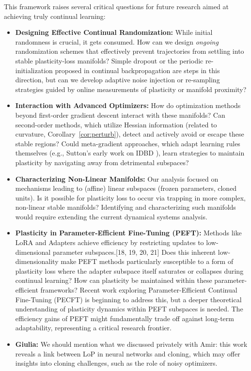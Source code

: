 \documentclass{article}
\newcommand{\giulia}[1]{{\color{ForestGreen}\textbf{Giulia:} #1}}
\begin{document}
This framework raises several critical questions for future research aimed at achieving truly continual learning:

\begin{itemize}[nosep]
    \item \textbf{Designing Effective Continual Randomization:} While initial randomness is crucial, it gets consumed. How can we design \emph{ongoing} randomization schemes that effectively prevent trajectories from settling into stable plasticity-loss manifolds? Simple dropout \citep{srivastava2014dropout} or the periodic re-initialization proposed in continual backpropagation \citep{dohare2024loss} are steps in this direction, but can we develop adaptive noise injection or re-sampling strategies guided by online measurements of plasticity or manifold proximity?
    \item \textbf{Interaction with Advanced Optimizers:} How do optimization methods beyond first-order gradient descent interact with these manifolds? Can second-order methods, which utilize Hessian information (related to curvature, Corollary~\ref{cor:perturb}), detect and actively avoid or escape these stable regions? Could meta-gradient approaches, which adapt learning rules themselves (e.g., Sutton's early work on IDBD \citep{sutton1992gain}), learn strategies to maintain plasticity by navigating away from detrimental subspaces? 
    \item \textbf{Characterizing Non-Linear Manifolds:} Our analysis focused on mechanisms leading to (affine) linear subspaces (frozen parameters, cloned units). Is it possible for plasticity loss to occur via trapping in more complex, non-linear stable manifolds? Identifying and characterizing such manifolds would require extending the current dynamical systems analysis.
    \item \textbf{Plasticity in Parameter-Efficient Fine-Tuning (PEFT):} Methods like LoRA \citep{hu2021lora} and Adapters \citep{houlsby2019parameter} achieve efficiency by restricting updates to low-dimensional parameter subspaces.[18, 19, 20, 21] Does this inherent low-dimensionality make PEFT methods particularly susceptible to a form of plasticity loss where the adapter subspace itself saturates or collapses during continual learning? How can plasticity be maintained within these parameter-efficient frameworks? Recent work exploring Parameter-Efficient Continual Fine-Tuning (PECFT) is beginning to address this, but a deeper theoretical understanding of plasticity dynamics within PEFT subspaces is needed. The efficiency gains of PEFT might fundamentally trade off against long-term adaptability, representing a critical research frontier.
    \item \giulia{We should mention what we discussed privately with Amir: this work reveals a link between LoP in neural networks and cloning, which may offer insights into cloning challenges, such as the role of noisy optimizers.}
\end{itemize}
\end{document}
